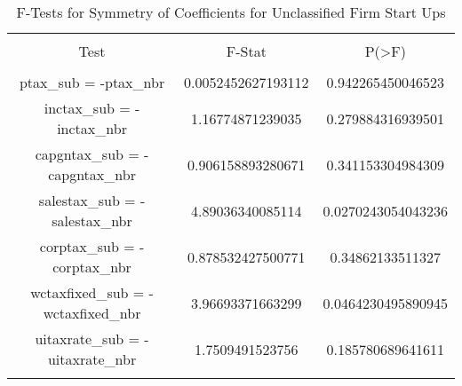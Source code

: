 
\begin{table}[!htbp] \centering 
  \caption{F-Tests for Symmetry of Coefficients for Unclassified Firm Start Ups} 
  \label{} 
\begin{tabular}{@{\extracolsep{5pt}} ccc} 
\\[-1.8ex]\hline 
\hline \\[-1.8ex] 
Test & F-Stat & P(\textgreater F) \\ 
\hline \\[-1.8ex] 
ptax\_sub = -ptax\_nbr & 0.0052452627193112 & 0.942265450046523 \\ 
inctax\_sub = -inctax\_nbr & 1.16774871239035 & 0.279884316939501 \\ 
capgntax\_sub = -capgntax\_nbr & 0.906158893280671 & 0.341153304984309 \\ 
salestax\_sub = -salestax\_nbr & 4.89036340085114 & 0.0270243054043236 \\ 
corptax\_sub = -corptax\_nbr & 0.878532427500771 & 0.34862133511327 \\ 
wctaxfixed\_sub = -wctaxfixed\_nbr & 3.96693371663299 & 0.0464230495890945 \\ 
uitaxrate\_sub = -uitaxrate\_nbr & 1.7509491523756 & 0.185780689641611 \\ 
\hline \\[-1.8ex] 
\end{tabular} 
\end{table} 
